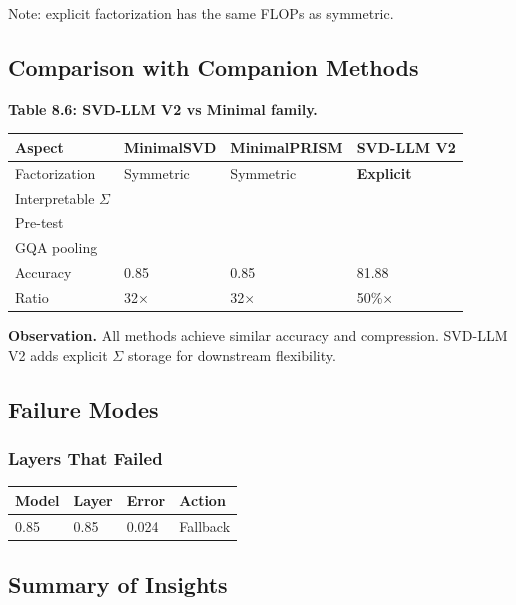 Note: explicit factorization has the same FLOPs as symmetric.

\subsection{Comparison with Companion Methods}

\textbf{Table 8.6: SVD-LLM V2 vs Minimal family.}

\begin{table}[H]
\centering
\small
\begin{tabular}{llll}
\toprule
\textbf{Aspect} & \textbf{MinimalSVD} & \textbf{MinimalPRISM} & \textbf{SVD-LLM V2} \\
\midrule
Factorization & Symmetric & Symmetric & \textbf{Explicit} \\
Interpretable $\Sigma$ &  &  & \textbf{ } \\
Pre-test &  &  &  \\
GQA pooling &  &  &  \\
Accuracy & 0.85 & 0.85 & 81.88 \\
Ratio & 32$\times$ & 32$\times$ & 50\%$\times$ \\
\bottomrule
\end{tabular}
\end{table}

\textbf{Observation.} All methods achieve similar accuracy and compression. 
SVD-LLM V2 adds explicit $\Sigma$ storage for downstream flexibility.

\subsection{Failure Modes}

\subsubsection{Layers That Failed}

\begin{table}[H]
\centering
\small
\begin{tabular}{llll}
\toprule
\textbf{Model} & \textbf{Layer} & \textbf{Error} & \textbf{Action} \\
\midrule
0.85 & 0.85 & 0.024 & Fallback \\
\bottomrule
\end{tabular}
\end{table}

\subsection{Summary of Insights}

